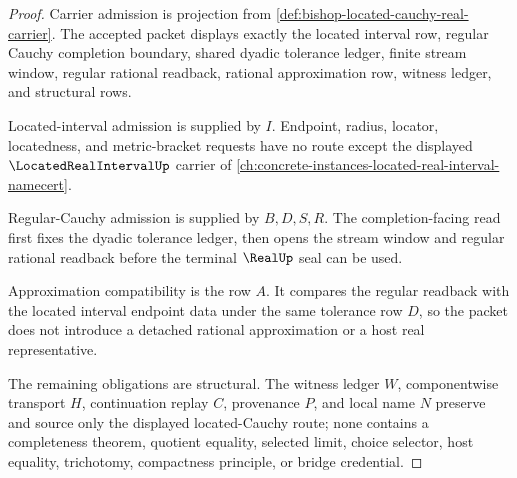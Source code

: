 \begin{proof}
Carrier admission is projection from \autoref{def:bishop-located-cauchy-real-carrier}. The accepted packet displays exactly the located interval row, regular Cauchy completion boundary, shared dyadic tolerance ledger, finite stream window, regular rational readback, rational approximation row, witness ledger, and structural rows.

Located-interval admission is supplied by $I$. Endpoint, radius, locator, locatedness, and metric-bracket requests have no route except the displayed $\LocatedRealIntervalUp$ carrier of \autoref{ch:concrete-instances-located-real-interval-namecert}.

Regular-Cauchy admission is supplied by $B,D,S,R$. The completion-facing read first fixes the dyadic tolerance ledger, then opens the stream window and regular rational readback before the terminal $\RealUp$ seal can be used.

Approximation compatibility is the row $A$. It compares the regular readback with the located interval endpoint data under the same tolerance row $D$, so the packet does not introduce a detached rational approximation or a host real representative.

The remaining obligations are structural. The witness ledger $W$, componentwise transport $H$, continuation replay $C$, provenance $P$, and local name $N$ preserve and source only the displayed located-Cauchy route; none contains a completeness theorem, quotient equality, selected limit, choice selector, host equality, trichotomy, compactness principle, or bridge credential.
\end{proof}

